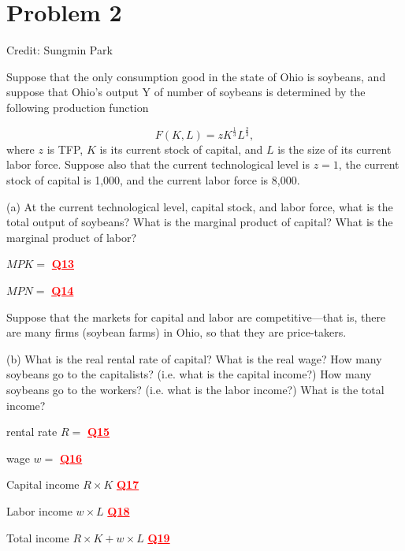 \documentclass[14pt]{extarticle}
\newcommand{\red}[1]{\textcolor{red}{#1}}
\begin{document}
\section*{Problem 2}

Credit: Sungmin Park

Suppose that the only consumption good in the state of Ohio is soybeans, and suppose that Ohio's output Y of number of soybeans is determined by the following production function

%
\begin{equation}
\label{eq:production}
    F( K, L ) = z K^{\frac{1}{3}} L^{\frac{2}{3}}
,\end{equation}
%
where $z$ is TFP, $K$ is its current stock of capital, and $L$ is the size of its current labor force.
Suppose also that the current technological level is $z=1$, the current stock of capital is 1,000, and the current labor force is 8,000.

(a) At the current technological level, capital stock, and labor force, what is the total output of soybeans? What is the marginal product of capital? What is the marginal product of labor?

\begin{center}
    $ MPK =$ \textbf{\red{\underline{\quad Q13 \quad}}}

    $ MPN =$ \textbf{\red{\underline{\quad Q14 \quad}}}
\end{center}



Suppose that the markets for capital and labor are competitive---that is, there are many firms (soybean farms) in Ohio, so that they are price-takers.

(b) What is the real rental rate of capital? What is the real wage? How many soybeans go to the capitalists? (i.e. what is the capital income?) How many soybeans go to the workers? (i.e. what is the labor income?) What is the total income?

\begin{center}
    rental rate $ R =  $ \textbf{\red{\underline{\quad Q15 \quad}}}

    wage $ w =  $ \textbf{\red{\underline{\quad Q16 \quad}}}

    Capital income $ R \times K $  \textbf{\red{\underline{\quad Q17 \quad}}}

    Labor income $ w \times L $  \textbf{\red{\underline{\quad Q18 \quad}}}

    Total income $ R \times K + w \times L $  \textbf{\red{\underline{\quad Q19 \quad}}}
\end{center}
\end{document}
